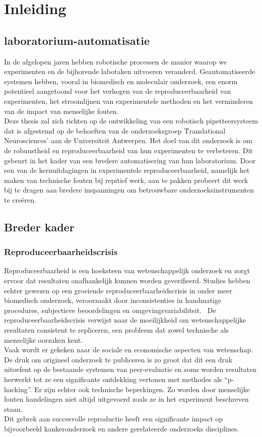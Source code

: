 \chapter{Inleiding}
\section{laboratorium-automatisatie}
In de afgelopen jaren hebben robotische processen de manier waarop we experimenten en de bijhorende labotaken uitvoeren veranderd. Geautomatiseerde systemen hebben, vooral in biomedisch en moleculair onderzoek, een enorm potentieel aangetoond voor het verhogen van de reproduceerbaarheid van experimenten, het stroomlijnen van experimentele methoden en het verminderen van de impact van menselijke fouten.\cite{RN5} 
\\[12pt]Deze thesis zal zich richten op de ontwikkeling van een robotisch pipetteersysteem dat is afgestemd op de behoeften van de onderzoeksgroep \'Translational Neurosciences' aan de Universiteit Antwerpen. Het doel van dit onderzoek is om de robuustheid en reproduceerbaarheid van hun experimenten te verbeteren. Dit gebeurt in het kader van een bredere automatisering van hun laboratorium. Door een van de kernuitdagingen in experimentele reproduceerbaarheid, namelijk het maken van technische fouten bij repitief werk, aan te pakken probeert dit werk bij te dragen aan bredere inspanningen om betrouwbare onderzoeksinstrumenten te creëren.

\section{Breder kader}

\subsection{Reproduceerbaarheidscrisis}
Reproduceerbaarheid is een hoeksteen van wetenschappelijk onderzoek en zorgt ervoor dat resultaten onafhankelijk kunnen worden geverifieerd. Studies hebben echter gewezen op een groeiende reproduceerbaarheidscrisis in onder meer biomedisch onderzoek, veroorzaakt door inconsistenties in handmatige procedures, subjectieve beoordelingen en omgevingsvariabiliteit.\ \cite{RN2} De reproduceerbaarheidscrisis verwijst naar de moeilijkheid om wetenschappelijke resultaten consistent te repliceren, een probleem dat zowel technische als menselijke oorzaken kent. 
\\[12pt]Vaak wordt er gekeken naar de sociale en economische aspecten van wetenschap.\cite{RN12} De druk om origineel onderzoek te publiceren is zo groot dat dit een druk uitoefent op de bestaande systemen van peer-evaluatie en soms worden resultaten herwerkt tot ze een significante ontdekking vertonen met methodes als “p-hacking”.\cite{RN2,RN6} Er zijn echter ook technische beperkingen. Zo worden door menselijke fouten handelingen niet altijd uitgevoerd zoals ze in het experiment beschreven staan. 
\\[12pt]Dit gebrek aan succesvolle reproductie heeft een significante impact op bijvoorbeeld kankeronderzoek en andere gerelateerde onderzoeks disciplines.\ \cite{RN4}

